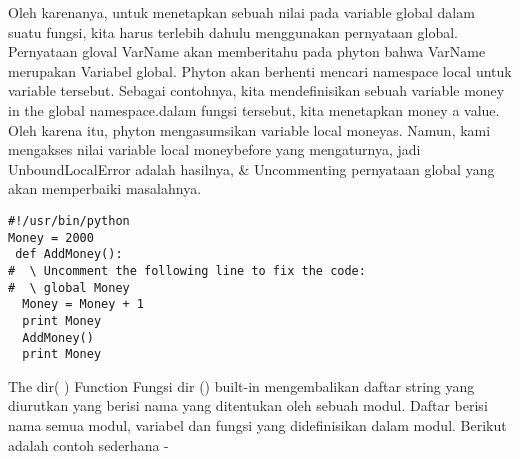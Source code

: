 Oleh karenanya, untuk menetapkan sebuah nilai pada variable global dalam suatu fungsi, kita harus terlebih dahulu menggunakan pernyataan global. Pernyataan gloval VarName akan memberitahu pada phyton bahwa VarName merupakan Variabel global. Phyton akan berhenti mencari namespace local untuk variable tersebut.
Sebagai contohnya, kita mendefinisikan sebuah variable money in the global namespace.dalam fungsi tersebut, kita menetapkan money a value. Oleh karena itu, phyton mengasumsikan variable local moneyas. Namun, kami mengakses nilai variable local moneybefore yang mengaturnya, jadi UnboundLocalError adalah hasilnya, \& Uncommenting pernyataan global yang akan memperbaiki masalahnya.
 
\begin{verbatim}
#!/usr/bin/python  
Money = 2000  
 def AddMoney():  
#  \ Uncomment the following line to fix the code:  
#  \ global Money  
  Money = Money + 1  
  print Money  
  AddMoney() 
  print Money
 \end{verbatim}
The dir( ) Function  
Fungsi dir () built-in mengembalikan daftar string yang diurutkan yang berisi nama yang ditentukan oleh sebuah modul. 
Daftar berisi nama semua modul, variabel dan fungsi yang didefinisikan dalam modul. Berikut adalah contoh sederhana - 
